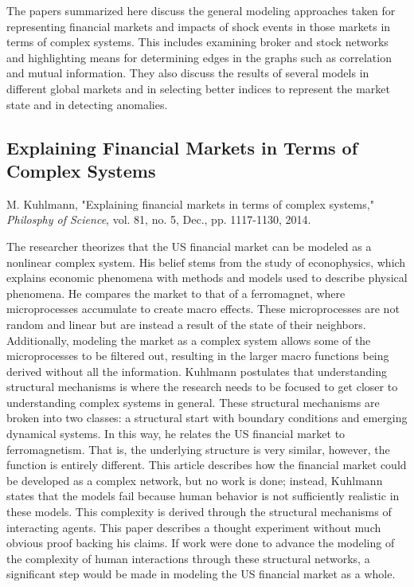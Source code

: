 \documentclass[12pt]{article}
\begin{document}
The papers summarized here discuss the general modeling approaches taken for representing financial markets and impacts of shock events in those markets in terms of complex systems. This includes examining broker and stock networks and highlighting means for determining edges in the graphs such as correlation and mutual information. They also discuss the results of several models in different global markets and in selecting better indices to represent the market state and in detecting anomalies.


\subsection{Explaining Financial Markets in Terms of Complex Systems}
M. Kuhlmann, "Explaining financial markets in terms of complex systems," \textit{Philosphy of Science}, vol. 81, no. 5, Dec., pp. 1117-1130, 2014. %
\newline

The researcher theorizes that the US financial market can be modeled as a nonlinear complex system. His belief stems from the study of econophysics, which explains economic phenomena with methods and models used to describe physical phenomena. He compares the market to that of a ferromagnet, where microprocesses accumulate to create macro effects. These microprocesses are not random and linear but are instead a result of the state of their neighbors. Additionally, modeling the market as a complex system allows some of the microprocesses to be filtered out, resulting in the larger macro functions being derived without all the information. Kuhlmann postulates that understanding structural mechanisms is where the research needs to be focused to get closer to understanding complex systems in general. These structural mechanisms are broken into two classes: a structural start with boundary conditions and emerging dynamical systems. In this way, he relates the US financial market to ferromagnetism. That is, the underlying structure is very similar, however, the function is entirely different. This article describes how the financial market could be developed as a complex network, but no work is done; instead, Kuhlmann states that the models fail because human behavior is not sufficiently realistic in these models. This complexity is derived through the structural mechanisms of interacting agents. This paper describes a thought experiment without much obvious proof backing his claims. If work were done to advance the modeling of the complexity of human interactions through these structural networks, a significant step would be made in modeling the US financial market as a whole.
\end{document}
